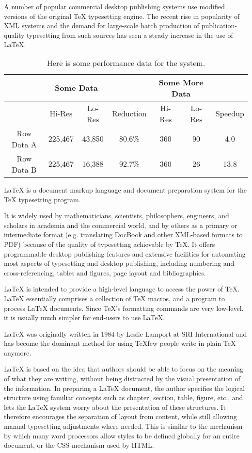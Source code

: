 \documentclass[12pt]{ucthesis}
\newcommand{\captionfonts}{\small\bf\ssp}
\begin{document}
A number of popular commercial desktop publishing systems use modified versions of the original TeX typesetting engine. The recent rise in popularity of XML systems and the demand for large-scale batch production of publication-quality typesetting from such sources has seen a steady increase in the use of LaTeX.


\begin{table}
\begin{center}

\begin{tabular}{|c|c|c|c|c|c|c|}
\hline 
&
\multicolumn{2}{c|}{Some Data}&
&
\multicolumn{2}{c|}{Some More Data}&
\tabularnewline
\hline
\hline 
&  Hi-Res&  Lo-Res&  Reduction&  Hi-Res&  Lo-Res&  Speedup
\tabularnewline
\hline 
Row Data A &  225,467&  43,850&  80.6\%&  360&  90&  4.0
\tabularnewline
\hline 
Row Data B &  225,467&  16,388&  92.7\%&  360&  26&  13.8
\tabularnewline
\hline 
\end{tabular}


\captionfonts
\caption[Performance data]{Here is some performance data for the system.}
\label{table:performance}
\end{center}
\end{table}


LaTeX is a document markup language and document preparation system for the TeX typesetting program.

It is widely used by mathematicians, scientists, philosophers, engineers, and scholars in academia and the commercial world, and by others as a primary or intermediate format (e.g. translating DocBook and other XML-based formats to PDF) because of the quality of typesetting achievable by TeX. It offers programmable desktop publishing features and extensive facilities for automating most aspects of typesetting and desktop publishing, including numbering and cross-referencing, tables and figures, page layout and bibliographies.

LaTeX is intended to provide a high-level language to access the power of TeX. LaTeX essentially comprises a collection of TeX macros, and a program to process LaTeX documents. Since TeX's formatting commands are very low-level, it is usually much simpler for end-users to use LaTeX.

LaTeX was originally written in 1984 by Leslie Lamport at SRI International and has become the dominant method for using TeXfew people write in plain TeX anymore.

LaTeX is based on the idea that authors should be able to focus on the meaning of what they are writing, without being distracted by the visual presentation of the information. In preparing a LaTeX document, the author specifies the logical structure using familiar concepts such as chapter, section, table, figure, etc., and lets the LaTeX system worry about the presentation of these structures. It therefore encourages the separation of layout from content, while still allowing manual typesetting adjustments where needed. This is similar to the mechanism by which many word processors allow styles to be defined globally for an entire document, or the CSS mechanism used by HTML.
\end{document}
